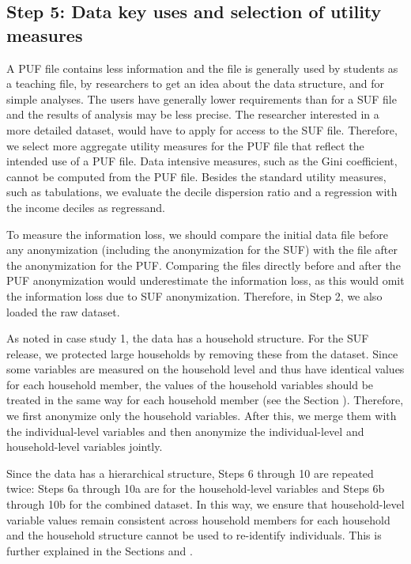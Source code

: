 \documentclass[letterpaper,10pt,english]{sphinxmanual}
\begin{document}
\subsection{Step 5: Data key uses and selection of utility measures}
\label{\detokenize{casestudies:id10}}
A PUF file contains less information and the file is generally used by
students as a teaching file, by researchers to get an idea about the
data structure, and for simple analyses. The users have generally lower
requirements than for a SUF file and the results of analysis may be less
precise. The researcher interested in a more detailed dataset, would
have to apply for access to the SUF file. Therefore, we select more
aggregate utility measures for the PUF file that reflect the intended
use of a PUF file. Data intensive measures, such as the Gini
coefficient, cannot be computed from the PUF file. Besides the standard
utility measures, such as tabulations, we evaluate the decile dispersion
ratio and a regression with the income deciles as regressand.

To measure the information loss, we should compare the initial data file
before any anonymization (including the anonymization for the SUF) with
the file after the anonymization for the PUF. Comparing the files
directly before and after the PUF anonymization would underestimate the
information loss, as this would omit the information loss due to SUF
anonymization. Therefore, in Step 2, we also loaded the raw dataset.


As noted in case study 1, the data has a household structure. For the
SUF release, we protected large households by removing these from the
dataset. Since some variables are measured on the household level and
thus have identical values for each household member, the values of the
household variables should be treated in the same way for each household
member (see the Section
). Therefore, we first anonymize only the
household variables. After this, we merge them with the individual-level
variables and then anonymize the individual-level and household-level
variables jointly.

Since the data has a hierarchical structure, Steps 6 through 10 are
repeated twice: Steps 6a through 10a are for the household-level
variables and Steps 6b through 10b for the combined dataset. In this
way, we ensure that household-level variable values remain consistent
across household members for each household and the household structure
cannot be used to re-identify individuals. This is further explained in
the Sections 
and .
\end{document}
